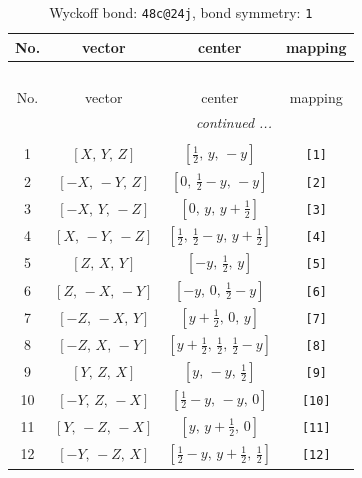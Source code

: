 \documentclass[fleqn,8pt]{jsarticle}
\begin{document}
\begin{longtable}{cccc}
\caption{Wyckoff bond: {\tt 48c@24j}, bond symmetry: {\tt 1}}
 \\
 \hline \hline
No. & vector & center & mapping \\ \hline \endfirsthead

\multicolumn{3}{l}{\tablename\ \thetable{}} \\
 \hline \hline
No. & vector & center & mapping \\ \hline \endhead

 \hline \hline
\multicolumn{3}{r}{\footnotesize\it continued ...} \\ \endfoot

 \hline \hline
\multicolumn{3}{r}{} \\ \endlastfoot

1 & $\left[ X,\, Y,\, Z \right]$ & $\left[ \frac{1}{2},\, y,\, - y \right]$ & {\tt [1]} \\ \hline
2 & $\left[ - X,\, - Y,\, Z \right]$ & $\left[ 0,\, \frac{1}{2} - y,\, - y \right]$ & {\tt [2]} \\ \hline
3 & $\left[ - X,\, Y,\, - Z \right]$ & $\left[ 0,\, y,\, y + \frac{1}{2} \right]$ & {\tt [3]} \\ \hline
4 & $\left[ X,\, - Y,\, - Z \right]$ & $\left[ \frac{1}{2},\, \frac{1}{2} - y,\, y + \frac{1}{2} \right]$ & {\tt [4]} \\ \hline
5 & $\left[ Z,\, X,\, Y \right]$ & $\left[ - y,\, \frac{1}{2},\, y \right]$ & {\tt [5]} \\ \hline
6 & $\left[ Z,\, - X,\, - Y \right]$ & $\left[ - y,\, 0,\, \frac{1}{2} - y \right]$ & {\tt [6]} \\ \hline
7 & $\left[ - Z,\, - X,\, Y \right]$ & $\left[ y + \frac{1}{2},\, 0,\, y \right]$ & {\tt [7]} \\ \hline
8 & $\left[ - Z,\, X,\, - Y \right]$ & $\left[ y + \frac{1}{2},\, \frac{1}{2},\, \frac{1}{2} - y \right]$ & {\tt [8]} \\ \hline
9 & $\left[ Y,\, Z,\, X \right]$ & $\left[ y,\, - y,\, \frac{1}{2} \right]$ & {\tt [9]} \\ \hline
10 & $\left[ - Y,\, Z,\, - X \right]$ & $\left[ \frac{1}{2} - y,\, - y,\, 0 \right]$ & {\tt [10]} \\ \hline
11 & $\left[ Y,\, - Z,\, - X \right]$ & $\left[ y,\, y + \frac{1}{2},\, 0 \right]$ & {\tt [11]} \\ \hline
12 & $\left[ - Y,\, - Z,\, X \right]$ & $\left[ \frac{1}{2} - y,\, y + \frac{1}{2},\, \frac{1}{2} \right]$ & {\tt [12]} \\ \hline

\end{longtable}
\end{document}
